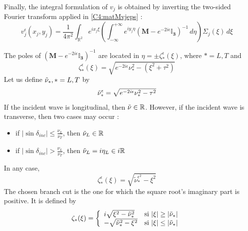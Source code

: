 Finally, the integral formulation of $v_j$ is obtained by inverting the two-sided Fourier transform applied in \eqref{C4:matMvjeps} :
\begin{equation}
v_j^{\epsilon}(x_j,y_j)=\frac{1}{4\pi^2}\int_{\mathbb{R}^2} e^{i x_j\xi}\left( \int_{-\infty}^{+\infty}e^{iy_j\eta} (\mathbf{M}-e^{-2i\epsilon}\mathbf{\mathbb{I}_3})^{-1} \,d\eta \right) \Sigma_j(\xi) \,d\xi
 \label{C4:invdouble}
\end{equation}

The poles of $(\mathbf{M}-e^{-2i\epsilon}\mathbf{\mathbb{I}_3})^{-1}$ are located in $\eta=\pm \zeta_*^{\epsilon}(\xi)$, where $*=L,T$ and
\begin{equation}
\zeta_*^{\epsilon}(\xi)=\sqrt{e^{-2i\epsilon}\nu^2_*-(\xi^2+\tau^2)}
\end{equation}
Let us define $\tilde{\nu}_*, *=L,T$ by
\begin{equation}
\tilde{\nu}_*^{\epsilon}=\sqrt{e^{-2i\epsilon}\nu_*^2-\tau^2}
\label{defnutieps}
\end{equation}
If the incident wave is longitudinal, then $\tilde{\nu} \in \mathbb{R}$. However, if the incident wave is transverse, then two cases may occur :
\begin{itemize}
	\item if $|\sin\delta_{inc}| \leq \frac{\nu_L}{\nu_T}$, then $\tilde{\nu}_L \in \mathbb{R}$
	\item if $|\sin\delta_{inc}| >\frac{\nu_L}{\nu_T}$, then $\tilde{\nu}_L=i\eta_L \in i\mathbb{R}$ 
\end{itemize} 
In any case,
\begin{equation}
\zeta_*^{\epsilon}(\xi)=\sqrt{\tilde{\nu}_*^{\epsilon^2}-\xi^2}
\end{equation}
The chosen branch cut is the one for which the square root's imaginary part is positive. It is defined by
 \begin{eqnarray}
 \zeta_*(\xi)=
 \left\{
 \begin{array}{lr}
 i\sqrt{\xi^2-\tilde{\nu}_*^2}& \mbox{si } |\xi| \geq |\tilde{\nu}_*| \\
 -\sqrt{\tilde{\nu}_*^2-\xi^2}& \mbox{si } |\xi| \leq |\tilde{\nu}_*|
 \end{array}
 \right.
 \label{defzeta}
 \end{eqnarray}

